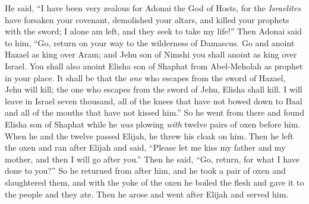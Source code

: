 \begin{biblechapter}
\verse He said, “I have been very zealous for Adonai the God of Hosts, for the \textit{Israelites} have forsaken your covenant, demolished your altars, and killed your prophets with the sword; I alone am left, and they seek to take my life!”
\verse Then Adonai said to him, “Go, return on your way to the wilderness of Damascus. Go and anoint Hazael as king over Aram;
\verse and Jehu son of Nimshi you shall anoint as king over Israel. You shall also anoint Elisha son of Shaphat from Abel-Meholah as prophet in your place.
\verse It shall be that the \textit{one} who escapes from the sword of Hazael, Jehu will kill; the one who escapes from the sword of Jehu, Elisha shall kill.
\verse I will leave in Israel seven thousand, all of the knees that have not bowed down to Baal and all of the mouths that have not kissed him.”
\verse So he went from there and found Elisha son of Shaphat while he \textit{was} plowing \textit{with} twelve pairs of oxen before him. When he and the twelve passed Elijah, he threw his cloak on him.
\verse Then he left the oxen and ran after Elijah and said, “Please let me kiss my father and my mother, and then I will go after you.” Then he said, “Go, return, for what I have done to you?”
\verse So he returned from after him, and he took a pair of oxen and slaughtered them, and with the yoke of the oxen he boiled the flesh and gave it to the people and they ate. Then he arose and went after Elijah and served him.
\end{biblechapter}

